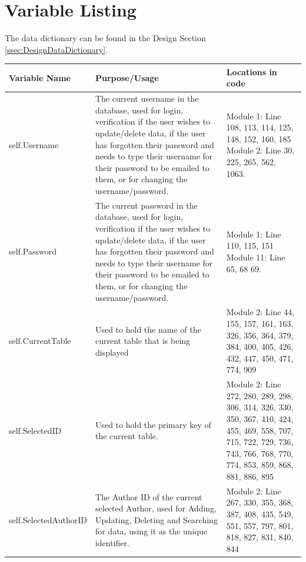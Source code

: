 \section{Variable Listing}

The data dictionary can be found in the Design Section \ref{ssec:DesignDataDictionary}.

\begin{center}
\begin{tabular}{|p{3.5cm}|p{4cm}|p{3cm}|}
    \hline
    \textbf{Variable Name} & \textbf{Purpose/Usage} & \textbf{Locations in code} \\ \hline
    self.Username & The current username in the database, used for login, verification if the user wishes to update/delete data, if the user has forgotten their password and needs to type their username for their password to be emailed to them, or for changing the username/password. & Module 1: Line 108, 113, 114, 125, 148, 152, 160, 185 \newline  Module 2: Line 30, 225, 265, 562, 1063. \\ \hline
    self.Password & The current password in the database, used for login, verification if the user wishes to update/delete data, if the user has forgotten their password and needs to type their username for their password to be emailed to them, or for changing the username/password. & Module 1: Line 110, 115, 151 \newline Module 11: Line 65, 68 69. \\ \hline
    self.CurrentTable & Used to hold the name of the current table that is being displayed &  Module 2: Line 44, 155, 157, 161, 163, 326, 356, 364, 379, 384, 400, 405, 426, 432, 447, 450, 471, 774, 909 \\ \hline
    self.SelectedID & Used to hold the primary key of the current table. & Module 2: Line 272, 280, 289, 298, 306, 314, 326, 330, 350, 367, 410, 424, 455, 469, 558, 707, 715, 722, 729, 736, 743, 766, 768, 770, 774, 853, 859, 868, 881, 886, 895 \\ \hline
    self.SelectedAuthorID & The Author ID of the current selected Author, used for Adding, Updating, Deleting and Searching for data, using it as the unique identifier. & Module 2: Line 267, 330, 355, 368, 387, 408, 435, 549, 551, 557, 797, 801, 818, 827, 831, 840, 844 \\ \hline
\end{tabular}
\end{center}

